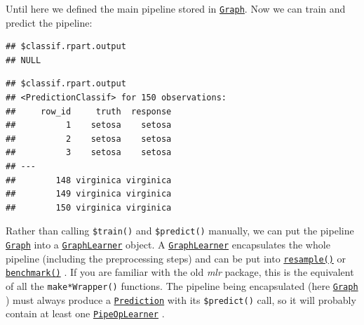 \documentclass[]{scrbook}
\newenvironment{Shaded}{\begin{snugshade}}{\end{snugshade}}
\newcommand{\KeywordTok}[1]{\textcolor[rgb]{0.13,0.29,0.53}{\textbf{#1}}}
\newcommand{\NormalTok}[1]{#1}
\newcommand{\OperatorTok}[1]{\textcolor[rgb]{0.81,0.36,0.00}{\textbf{#1}}}
\newcommand{\StringTok}[1]{\textcolor[rgb]{0.31,0.60,0.02}{#1}}
\renewenvironment{Shaded} {\begin{snugshade}\small} {\end{snugshade}}
\begin{document}
Until here we defined the main pipeline stored in \href{https://mlr3pipelines.mlr-org.com/reference/Graph.html}{\texttt{Graph}}.
Now we can train and predict the pipeline:

\begin{Shaded}
\end{Shaded}

\begin{verbatim}
## $classif.rpart.output
## NULL
\end{verbatim}

\begin{Shaded}
\end{Shaded}

\begin{verbatim}
## $classif.rpart.output
## <PredictionClassif> for 150 observations:
##     row_id     truth  response
##          1    setosa    setosa
##          2    setosa    setosa
##          3    setosa    setosa
## ---                           
##        148 virginica virginica
##        149 virginica virginica
##        150 virginica virginica
\end{verbatim}

Rather than calling \texttt{\$train()} and \texttt{\$predict()} manually, we can put the pipeline \href{https://mlr3pipelines.mlr-org.com/reference/Graph.html}{\texttt{Graph}} into a \href{https://mlr3pipelines.mlr-org.com/reference/mlr_learners_graph.html}{\texttt{GraphLearner}} object.
A \href{https://mlr3pipelines.mlr-org.com/reference/mlr_learners_graph.html}{\texttt{GraphLearner}} encapsulates the whole pipeline (including the preprocessing steps) and can be put into \href{https://mlr3.mlr-org.com/reference/resample.html}{\texttt{resample()}} or \href{https://mlr3.mlr-org.com/reference/benchmark.html}{\texttt{benchmark()}} .
If you are familiar with the old \emph{mlr} package, this is the equivalent of all the \texttt{make*Wrapper()} functions.
The pipeline being encapsulated (here \href{https://mlr3pipelines.mlr-org.com/reference/Graph.html}{\texttt{Graph}} ) must always produce a \href{https://mlr3.mlr-org.com/reference/Prediction.html}{\texttt{Prediction}} with its \texttt{\$predict()} call, so it will probably contain at least one \href{https://mlr3pipelines.mlr-org.com/reference/mlr_pipeops_learner.html}{\texttt{PipeOpLearner}} .
\end{document}
